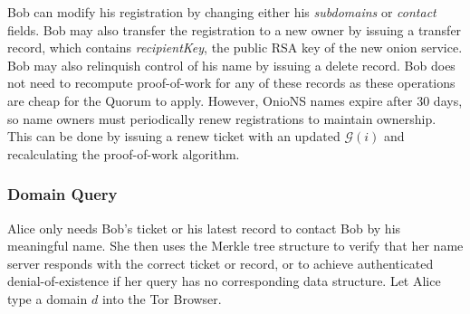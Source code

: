 \documentclass[USenglish,oneside,twocolumn]{article}
\begin{document}
Bob can modify his registration by changing either his \emph{subdomains} or \emph{contact} fields. Bob may also transfer the registration to a new owner by issuing a transfer record, which contains \emph{recipientKey}, the public RSA key of the new onion service. Bob may also relinquish control of his name by issuing a delete record. Bob does not need to recompute proof-of-work for any of these records as these operations are cheap for the Quorum to apply. However, OnioNS names expire after 30 days, so name owners must periodically renew registrations to maintain ownership. This can be done by issuing a renew ticket with an updated $ \mathcal{G}(i) $ and recalculating the proof-of-work algorithm.


\subsubsection{Domain Query}

Alice only needs Bob's ticket or his latest record to contact Bob by his meaningful name. She then uses the Merkle tree structure to verify that her name server responds with the correct ticket or record, or to achieve authenticated denial-of-existence if her query has no corresponding data structure. Let Alice type a domain $ d $ into the Tor Browser.
\end{document}
